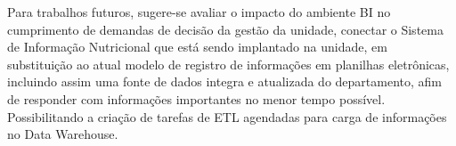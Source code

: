 Para trabalhos futuros, sugere-se avaliar o impacto do ambiente BI no cumprimento de demandas de decisão da gestão da unidade, conectar o Sistema de Informação Nutricional que está sendo implantado na unidade, em substituição ao atual modelo de registro de informações em planilhas eletrônicas, incluindo assim uma fonte de dados integra e atualizada do departamento, afim de responder com informações importantes no menor tempo possível. Possibilitando a criação de tarefas de ETL agendadas para carga de informações no Data Warehouse.